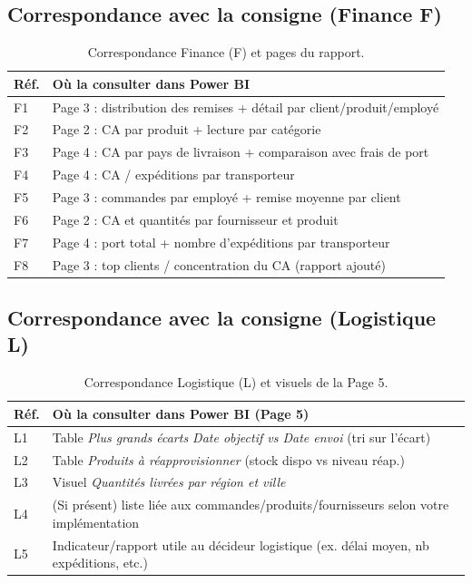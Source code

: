 \documentclass[a4paper,12pt]{article}
\begin{document}
\subsection{Correspondance avec la consigne (Finance F)}
\begin{table}[H]
\centering
\renewcommand{\arraystretch}{1.2}
\begin{tabular}{p{2cm} p{11.5cm}}
\toprule
\textbf{Réf.} & \textbf{Où la consulter dans Power BI} \\
\midrule
F1 & Page 3 : distribution des remises + détail par client/produit/employé \\
F2 & Page 2 : CA par produit + lecture par catégorie \\
F3 & Page 4 : CA par pays de livraison + comparaison avec frais de port \\
F4 & Page 4 : CA / expéditions par transporteur \\
F5 & Page 3 : commandes par employé + remise moyenne par client \\
F6 & Page 2 : CA et quantités par fournisseur et produit \\
F7 & Page 4 : port total + nombre d’expéditions par transporteur \\
F8 & Page 3 : top clients / concentration du CA (rapport ajouté) \\
\bottomrule
\end{tabular}
\caption{Correspondance Finance (F) et pages du rapport.}
\end{table}

\subsection{Correspondance avec la consigne (Logistique L)}
\begin{table}[H]
\centering
\renewcommand{\arraystretch}{1.2}
\begin{tabular}{p{2cm} p{11.5cm}}
\toprule
\textbf{Réf.} & \textbf{Où la consulter dans Power BI (Page 5)} \\
\midrule
L1 & Table \textit{Plus grands écarts Date objectif vs Date envoi} (tri sur l’écart) \\
L2 & Table \textit{Produits à réapprovisionner} (stock dispo vs niveau réap.) \\
L3 & Visuel \textit{Quantités livrées par région et ville} \\
L4 & (Si présent) liste liée aux commandes/produits/fournisseurs selon votre implémentation \\
L5 & Indicateur/rapport utile au décideur logistique (ex. délai moyen, nb expéditions, etc.) \\
\bottomrule
\end{tabular}
\caption{Correspondance Logistique (L) et visuels de la Page 5.}
\end{table}
\end{document}
